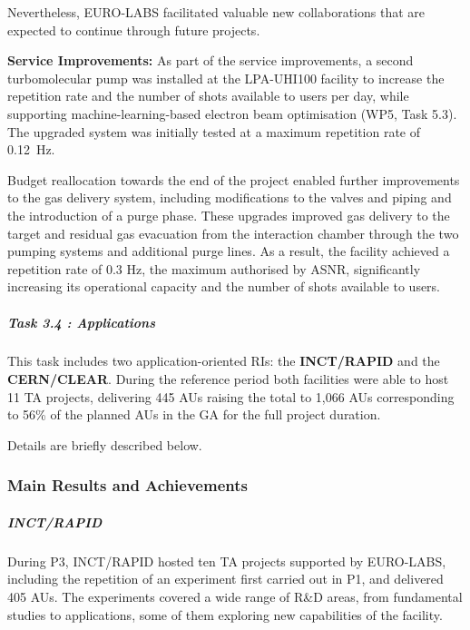 Nevertheless, EURO-LABS facilitated valuable new collaborations that are expected to continue through future projects.

\textbf{Service Improvements:} As part of the service improvements, a second turbomolecular pump was installed at the LPA-UHI100 facility to increase the repetition rate and the number of shots available to users per day, while supporting machine-learning-based electron beam optimisation (WP5, Task 5.3). The upgraded system was initially tested at a maximum repetition rate of \SI{0.12}{Hz}.

Budget reallocation towards the end of the project enabled further improvements to the gas delivery system, including modifications to the valves and piping and the introduction of a purge phase. These upgrades improved gas delivery to the target and residual gas evacuation from the interaction chamber through the two pumping systems and additional purge lines. As a result, the facility achieved a repetition rate of 0.3 Hz, the maximum authorised by ASNR, significantly increasing its operational capacity and the number of shots available to users.

\subparagraph{Task 3.4 : Applications} \mbox{}


This task includes two application-oriented RIs: the {\bf INCT/RAPID} and the {\bf CERN/CLEAR}. During the reference period both facilities were able to host 11 TA projects, delivering 445 AUs raising the total to 1,066 AUs corresponding to 56\% of the planned AUs in the GA for the full project duration. 

Details are briefly described below. 

\subsubsection*{Main Results and Achievements}


\subparagraph*{INCT/RAPID} 
During P3, INCT/RAPID hosted ten TA projects supported by EURO-LABS, including the repetition of an experiment first carried out in P1, and delivered 405 AUs. The experiments covered a wide range of R\&D areas, from fundamental studies to applications, some of them exploring new capabilities of the facility.

